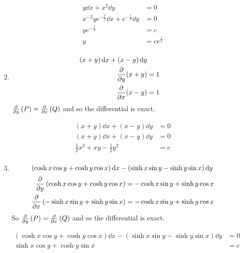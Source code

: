 \documentclass[10pt,\jkfside,a4paper]{article}
\begin{document}
\begin{enumerate}
\begin{enumerate}
\begin{equation}
\begin{split}
y \dd{x} + x^2 \dd{y} &= 0 \\
x^{-2}ye^{-\frac{1}{x}} \dd{x} + e^{-\frac{1}{x}} \dd{y} &= 0 \\
ye^{-\frac{1}{x}} &= c \\
y &= ce^{\frac{1}{x}} \\
\end{split}
\end{equation}

\item 
\begin{equation}
\begin{split}
(x + y) \dd{x} + (x - y) \dd{y} \\
\pdv{y}(x + y) &= 1 \\
\pdv{x}(x - y) &= 1 \\
\end{split}
\end{equation}
$\pdv{y}\left(P\right) = \pdv{x}\left(Q\right)$ and so the differential is exact.

\begin{equation}
\begin{split}
(x + y) \dd{x} + (x - y) \dd{y} &= 0 \\
(x + y) \dd{x} + (x - y) \dd{y} &= 0 \\
\frac{1}{2}x^2 + xy - \frac{1}{2}y^2 &= c \\
\end{split}
\end{equation}

\item 
\begin{equation*}
(\cosh x \cos y + \cosh y \cos x) \dd{x} - (\sinh x \sin y - \sinh y \sin x) \dd{y} \\
\end{equation*}
\begin{equation}
\begin{split}
\pdv{y}\left(\cosh x \cos y + \cosh y \cos x\right) &= -\cosh x \sin y + \sinh y \cos x \\
\pdv{x}\left(-\sinh x \sin y + \sinh y \sin x\right) &= -\cosh x \sin y + \sinh y \cos x \\
\end{split}
\end{equation}
So $\pdv{y}\left(P\right) = \pdv{x}\left(Q\right)$ and so the differential is exact.

\begin{equation}
\begin{split}
(\cosh x \cos y + \cosh y \cos x) \dd{x} - (\sinh x \sin y - \sinh y \sin x) \dd{y} &= 0 \\
\sinh x \cos y + \cosh y \sin x &= c \\
\end{split}
\end{equation}


\end{enumerate}
\end{enumerate}
\end{document}
